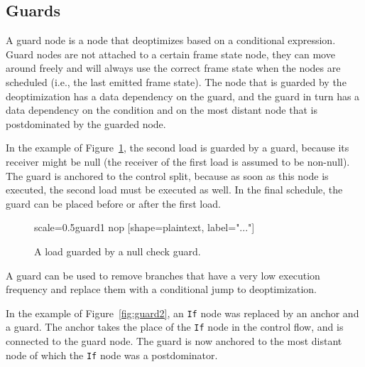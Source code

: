 \documentclass[twocolumn]{svjour3}
\begin{document}
\subsection{Guards}
A guard node is a node that deoptimizes based on a conditional expression.
Guard nodes are not attached to a certain frame state node, they can move around freely and will always use the correct frame state when the nodes are scheduled (i.e., the last emitted frame state).
The node that is guarded by the deoptimization has a data dependency on the guard, and the guard in turn has a data dependency on the condition and on the most distant node that is postdominated by the guarded node.

In the example of Figure~\ref{fig:guard1}, the second load is guarded by a guard, because its receiver might be null (the receiver of the first load is assumed to be non-null).
The guard is anchored to the control split, because as soon as this node is executed, the second load must be executed as well.
In the final schedule, the guard can be placed before or after the first load.

\begin{figure}[h]
  \centering
\begin{digraphenv}{scale=0.5}{guard1}
    nop [shape=plaintext, label="..."]
\end{digraphenv}
  \caption{A load guarded by a null check guard.}
  \label{fig:guard1}
\end{figure}

A guard can be used to remove branches that have a very low execution frequency and replace them with a conditional jump to deoptimization.

In the example of Figure~\ref{fig:guard2}, an \texttt{If} node was replaced by an anchor and a guard.
The anchor takes the place of the \texttt{If} node in the control flow, and is connected to the guard node.
The guard is now anchored to the most distant node of which the \texttt{If} node was a postdominator.
\end{document}
